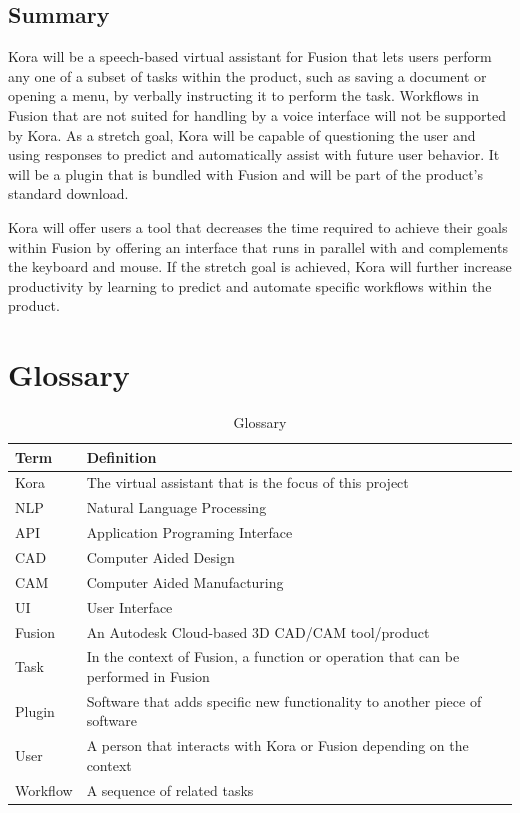 \documentclass[onecolumn, draftclsnofoot,10pt, compsoc]{IEEEtran}
\def \botname{Kora\xspace}
\begin{document}
	
	\subsection{Summary}
		\botname will be a speech-based virtual assistant for Fusion that lets users perform any one of a subset of tasks within the product, such as saving a document or opening a menu, by verbally instructing it to perform the task.
		Workflows in Fusion that are not suited for handling by a voice interface will not be supported by \botname.
		As a stretch goal, \botname will be capable of questioning the user and using responses to predict and automatically assist with future user behavior.
		It will be a plugin that is bundled with Fusion and will be part of the product's standard download. 
		
		\botname will offer users a tool that decreases the time required to achieve their goals within Fusion by offering an interface that runs in parallel with and complements the keyboard and mouse.
		If the stretch goal is achieved, \botname will further increase productivity by learning to predict and automate specific workflows within the product.

\section{Glossary}
	\begin{table}[H]
		\centering
		\caption{Glossary}
		\label{my-label}
		\begin{tabular}{|l|l|}
			\hline
			\textbf{Term} & \textbf{Definition} \\ \hline
			\botname & The virtual assistant that is the focus of this project \\ \hline
			NLP & Natural Language Processing \\ \hline
			API & Application Programing Interface \\ \hline
			CAD & Computer Aided Design \\ \hline
			CAM & Computer Aided Manufacturing \\ \hline
            UI & User Interface \\ \hline
			Fusion & An Autodesk Cloud-based 3D CAD/CAM tool/product \\ \hline
			Task & In the context of Fusion, a function or operation that can be performed in Fusion \\ \hline
			Plugin & Software that adds specific new functionality to another piece of software \\ \hline
			User & A person that interacts with \botname or Fusion depending on the context \\ \hline
			Workflow & A sequence of related tasks \\ \hline
		\end{tabular}
	\end{table}
\end{document}
